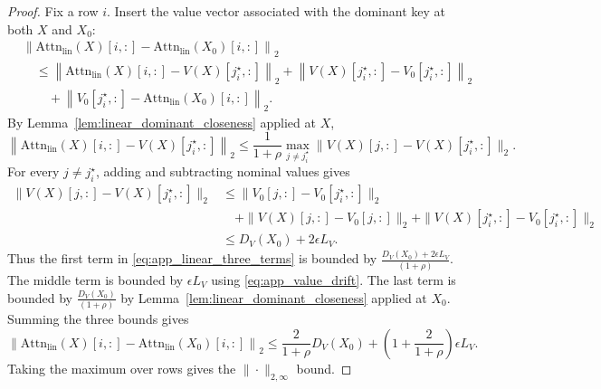 \documentclass[10pt,a4paper]{amsart}
\begin{document}
\begin{proof}
Fix a row $i$. Insert the value vector associated with the dominant key at both $X$ and $X_0$:
\begin{equation}
\begin{aligned}
    &\left\|
    \mathrm{Attn}_{\mathrm{lin}}(X)[i,:]
    -
    \mathrm{Attn}_{\mathrm{lin}}(X_0)[i,:]
    \right\|_2 \\
    &\quad\leq
    \left\|
    \mathrm{Attn}_{\mathrm{lin}}(X)[i,:]-V(X)[j_i^\star,:]
    \right\|_2
    +
    \left\|
    V(X)[j_i^\star,:]-V_0[j_i^\star,:]
    \right\|_2 \\
    &\qquad+
    \left\|
    V_0[j_i^\star,:]-\mathrm{Attn}_{\mathrm{lin}}(X_0)[i,:]
    \right\|_2.
\end{aligned}
\label{eq:app_linear_three_terms}
\end{equation}
By Lemma~\ref{lem:linear_dominant_closeness} applied at $X$,
\begin{equation}
    \left\|
    \mathrm{Attn}_{\mathrm{lin}}(X)[i,:]-V(X)[j_i^\star,:]
    \right\|_2
    \leq
    \frac{1}{1+\rho}
    \max_{j\neq j_i^\star}
    \|V(X)[j,:]-V(X)[j_i^\star,:]\|_2.
    \label{eq:app_linear_term_A}
\end{equation}
For every $j\neq j_i^\star$, adding and subtracting nominal values gives
\begin{equation}
\begin{aligned}
    \|V(X)[j,:]-V(X)[j_i^\star,:]\|_2
    &\leq
    \|V_0[j,:]-V_0[j_i^\star,:]\|_2 \\
    &\quad+
    \|V(X)[j,:]-V_0[j,:]\|_2
    +
    \|V(X)[j_i^\star,:]-V_0[j_i^\star,:]\|_2 \\
    &\leq
    D_V(X_0)
    +
    2\epsilon L_V.
\end{aligned}
\label{eq:app_linear_value_spread_perturbed}
\end{equation}
Thus the first term in \eqref{eq:app_linear_three_terms} is bounded by $\frac{D_V(X_0)+2\epsilon L_V}{(1+\rho)}$. The middle term is bounded by $\epsilon L_V$ using \eqref{eq:app_value_drift}. The last term is bounded by $\frac{D_V(X_0)}{(1+\rho)}$ by Lemma~\ref{lem:linear_dominant_closeness} applied at $X_0$. Summing the three bounds gives
\begin{equation}
    \left\|
    \mathrm{Attn}_{\mathrm{lin}}(X)[i,:]-
    \mathrm{Attn}_{\mathrm{lin}}(X_0)[i,:]
    \right\|_2
    \leq
    \frac{2}{1+\rho}D_V(X_0)
    +
    \left(
        1+\frac{2}{1+\rho}
    \right)
    \epsilon L_V.
\end{equation}
Taking the maximum over rows gives the $\|\cdot\|_{2,\infty}$ bound.
\end{proof}
\end{document}
